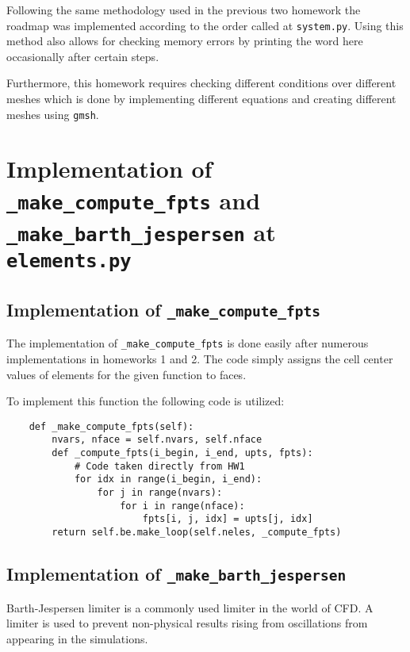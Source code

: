 \documentclass[a4paper, 12pt]{article}
\begin{document}
Following the same methodology used in the previous two homework the roadmap was implemented according to the order called at \verb|system.py|. Using this method also allows for checking memory errors by printing the word here occasionally after certain steps. \\\par
Furthermore, this homework requires checking different conditions over different meshes which is done by implementing different equations and creating different meshes using \verb|gmsh|.

\section{Implementation of \texttt{\_make\_compute\_fpts} and \texttt{\_make\_barth\_jespersen} at \texttt{elements.py}}
\subsection{Implementation of \texttt{\_make\_compute\_fpts}}

The implementation of \verb|_make_compute_fpts| is done easily after numerous implementations in homeworks 1 and 2. The code simply assigns the cell center values of elements for the given function to faces.\\\par

To implement this function the following code is utilized:
\begin{verbatim}
    def _make_compute_fpts(self):
        nvars, nface = self.nvars, self.nface
        def _compute_fpts(i_begin, i_end, upts, fpts):
            # Code taken directly from HW1
            for idx in range(i_begin, i_end):
                for j in range(nvars):
                    for i in range(nface):
                        fpts[i, j, idx] = upts[j, idx]
        return self.be.make_loop(self.neles, _compute_fpts)
\end{verbatim}

\subsection{Implementation of \texttt{\_make\_barth\_jespersen}}
Barth-Jespersen limiter is a commonly used limiter in the world of CFD. A limiter is used to prevent non-physical results rising from oscillations from appearing in the simulations.
\end{document}
